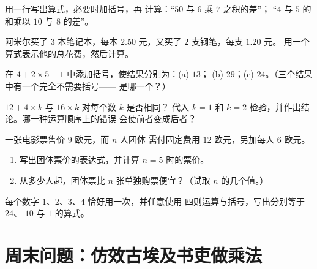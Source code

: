 \begin{exercise}[$\star$]\label{exo:g7:priorities:6}
用一行写出算式，必要时加括号，再
计算：“$50$ 与 $6$ 乘 $7$ 之积的差”；
“$4$ 与 $5$ 的和乘以 $10$ 与
$8$ 的差”。
\end{exercise}

\begin{exercise}[$\star$]\label{exo:g7:priorities:7}
阿米尔买了 $3$ 本笔记本，每本 $2.50$ 元，又买了 $2$ 支钢笔，每支 $1.20$ 元。
用一个算式表示他的总花费，然后计算。
\end{exercise}

\begin{exercise}[$\star\star$]\label{exo:g7:priorities:8}
在 $4 + 2 \times 5 - 1$ 中添加括号，使结果分别为：(a) $13$；
(b) $29$；(c) $24$。（三个结果中有一个完全不需要括号——
是哪一个？）
\end{exercise}

\begin{exercise}[$\star\star$]\label{exo:g7:priorities:9}
$12 + 4 \times k$ 与 $16 \times k$ 对每个数 $k$ 是否相同？
代入 $k = 1$ 和 $k = 2$ 检验，并作出结论。哪一种运算顺序上的错误
会使前者变成后者？
\end{exercise}

\begin{exercise}[$\star\star$]\label{exo:g7:priorities:10}
一张电影票售价 $9$ 欧元，而 $n$ 人团体
需付固定费用 $12$ 欧元，另加每人 $6$ 欧元。
\begin{enumerate}
  \item 写出团体票价的表达式，并计算
        $n = 5$ 时的票价。
  \item 从多少人起，团体票比 $n$
        张单独购票便宜？（试取 $n$ 的几个值。）
\end{enumerate}
\end{exercise}

\begin{exercise}[$\star\star\star$]\label{exo:g7:priorities:11}
每个数字 $1$、$2$、$3$、$4$ 恰好用一次，并任意使用
四则运算与括号，写出分别等于 $24$、
$10$ 与 $1$ 的算式。
\end{exercise}

\section{周末问题：仿效古埃及书吏做乘法}

